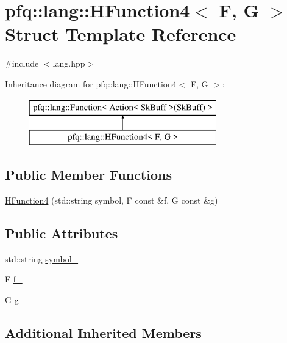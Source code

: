 \hypertarget{structpfq_1_1lang_1_1HFunction4}{\section{pfq\+:\+:lang\+:\+:H\+Function4$<$ F, G $>$ Struct Template Reference}
\label{structpfq_1_1lang_1_1HFunction4}
}


{\ttfamily \#include $<$lang.\+hpp$>$}

Inheritance diagram for pfq\+:\+:lang\+:\+:H\+Function4$<$ F, G $>$\+:\begin{figure}[H]
\begin{center}
\leavevmode
\includegraphics[height=2.000000cm]{structpfq_1_1lang_1_1HFunction4}
\end{center}
\end{figure}
\subsection*{Public Member Functions}
\begin{DoxyCompactItemize}
\item 
\hyperlink{structpfq_1_1lang_1_1HFunction4_a6ae3c404f1fcc8a24128159a39da9a45}{H\+Function4} (std\+::string symbol, F const \&f, G const \&g)
\end{DoxyCompactItemize}
\subsection*{Public Attributes}
\begin{DoxyCompactItemize}
\item 
std\+::string \hyperlink{structpfq_1_1lang_1_1HFunction4_ac7c063e108f068b576f4b7c370e8b75e}{symbol\+\_\+}
\item 
F \hyperlink{structpfq_1_1lang_1_1HFunction4_ad117b24d6ba99724581c1ec2ee7591b6}{f\+\_\+}
\item 
G \hyperlink{structpfq_1_1lang_1_1HFunction4_a1a9a821806c773b379940a042d2de595}{g\+\_\+}
\end{DoxyCompactItemize}
\subsection*{Additional Inherited Members}


